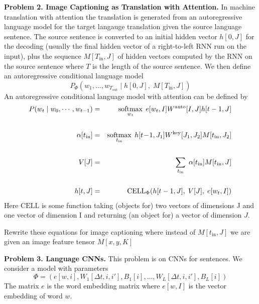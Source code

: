 \documentclass{article}
\newcommand{\solution}[1]{}
\begin{document}
\bigskip
{\bf Problem 2. Image Captioning as Translation with Attention.} In machine translation with attention the translation is generated from an autoregressive language model for the target langauge translation given the source language sentence.
The source sentence is converted to an initial hidden vector $h[0,J]$ for the decoding (usually the final hidden vector of a right-to-left RNN run on the input), plus the sequence
$M[T_{\mathrm{in}},J]$ of hidden vectors computed by the RNN on the source sentence where $T$ is the length of the source sentence.  We then define an autoregressive conditional language model
$$P_\Phi(w_1,\ldots,w_{T_\mathrm{out}}\;|\; h[0,J],\;M[T_{\mathrm{in}},J])$$
An autoregressive conditional language model with attention can be defined by
\begin{eqnarray*}
P(w_t\;|\;w_0,\cdots,w_{t-1}) & = & \operatorname*{softmax}_{w_t}\;e[w_t,I]W^{\mathrm{auto}}[I,J]h[t-1,J] \\
\\
\alpha[t_{\mathrm{in}}]& =& \operatorname*{softmax}_{t_\mathrm{in}} \;h[t\!-\!1,J_1]W^{\mathrm{key}}[J_1,J_2]M[t_{\mathrm{in}},J_2]\\
\\
V[J]& = & \sum_{t_{\mathrm{in}}}\;\alpha[t_{\mathrm{in}}]M[t_{\mathrm{in}},J] \\
\\
h[t,J] & = & \mathrm{CELL}_\Phi (h[t-1,J],\;V[J],\;e[w_t,I])
\end{eqnarray*}
Here $\mathrm{CELL}$ is some function taking (objects for) two vectors of dimensions J and one vector of dimension I and returning (an object for) a vector of dimension $J$.

\medskip
Rewrite these equations for image captioning where instead of $M[t_{\mathrm{in}},J]$ we are given an image feature tensor $M[x,y,K]$

\solution{
\begin{eqnarray*}
P(w_t\;|\;w_0,\cdots,w_{t-1}) & = & \softmax_{w_t}\;e[w_t,I]W^{\mathrm{auto}}[I,J]h[t-1,J] \\
\\
\alpha[x,y]& =& \softmax_{x,y} \;h[t\!-\!1,J]W^{\mathrm{key}}[J,K]M[x,y,K]\\
\\
V[K]& = & \sum_{x,y}\;\alpha[x,y]M[x,y,K] \\
\\
h[t,J] & = & \mathrm{CELL}_\Phi (h[t-1,J],\;V[K],\;e[w_t,I])
\end{eqnarray*}
}

\bigskip
{\bf Problem 3. Language CNNs.}
This problem is on CNNs for sentences.  We consider a model with parameters
$$\Phi = (e[w,i], W_1[\Delta t,i,i'], B_1[i],\ldots,W_L[\Delta t,i,i'],B_L[i])$$
The matrix $e$ is the word embedding matrix where $e[w,I]$ is the vector embedding of word $w$.
\end{document}
